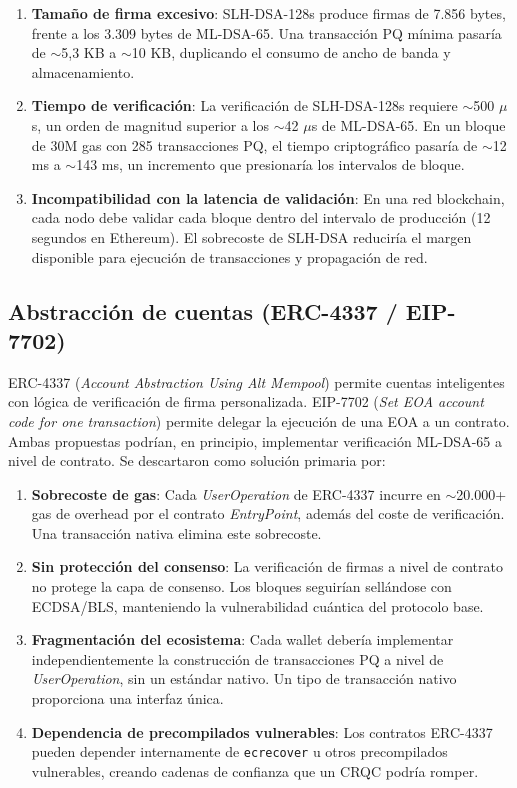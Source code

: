 \begin{enumerate}
  \item \textbf{Tamaño de firma excesivo}: SLH-DSA-128s produce firmas de 7.856 bytes, frente a los 3.309 bytes de ML-DSA-65. Una transacción PQ mínima pasaría de $\sim$5,3 KB a $\sim$10 KB, duplicando el consumo de ancho de banda y almacenamiento.
  
  \item \textbf{Tiempo de verificación}: La verificación de SLH-DSA-128s requiere $\sim$500 $\mu$s, un orden de magnitud superior a los $\sim$42 $\mu$s de ML-DSA-65. En un bloque de 30M gas con 285 transacciones PQ, el tiempo criptográfico pasaría de $\sim$12 ms a $\sim$143 ms, un incremento que presionaría los intervalos de bloque.
  
  \item \textbf{Incompatibilidad con la latencia de validación}: En una red blockchain, cada nodo debe validar cada bloque dentro del intervalo de producción (12 segundos en Ethereum). El sobrecoste de SLH-DSA reduciría el margen disponible para ejecución de transacciones y propagación de red.
\end{enumerate}

\subsection{Abstracción de cuentas (ERC-4337 / EIP-7702)}
\label{sec:erc4337}

ERC-4337 (\emph{Account Abstraction Using Alt Mempool}) permite cuentas inteligentes con lógica de verificación de firma personalizada. EIP-7702 (\emph{Set EOA account code for one transaction}) permite delegar la ejecución de una EOA a un contrato. Ambas propuestas podrían, en principio, implementar verificación ML-DSA-65 a nivel de contrato. Se descartaron como solución primaria por:

\begin{enumerate}
  \item \textbf{Sobrecoste de gas}: Cada \emph{UserOperation} de ERC-4337 incurre en $\sim$20.000+ gas de overhead por el contrato \emph{EntryPoint}, además del coste de verificación. Una transacción nativa elimina este sobrecoste.
  
  \item \textbf{Sin protección del consenso}: La verificación de firmas a nivel de contrato no protege la capa de consenso. Los bloques seguirían sellándose con ECDSA/BLS, manteniendo la vulnerabilidad cuántica del protocolo base.
  
  \item \textbf{Fragmentación del ecosistema}: Cada wallet debería implementar independientemente la construcción de transacciones PQ a nivel de \emph{UserOperation}, sin un estándar nativo. Un tipo de transacción nativo proporciona una interfaz única.
  
  \item \textbf{Dependencia de precompilados vulnerables}: Los contratos ERC-4337 pueden depender internamente de \texttt{ecrecover} u otros precompilados vulnerables, creando cadenas de confianza que un CRQC podría romper.
\end{enumerate}

